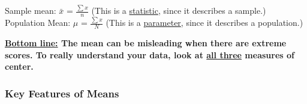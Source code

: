 \documentclass[11pt]{report}
\begin{document}
\noindent Sample mean: $\bar{x}$ = $\frac{\sum x}{n}$ (This is a \underline{statistic}, since it describes a sample.) 
\newline
Population Mean: $\mu$ = $\frac{\sum x}{N}$ (This is a \underline{parameter}, since it describes a population.)

{
    
    \textbf{\underline{Bottom line:} The mean can be misleading when there are extreme scores. To really understand your data, look at \underline{all three} measures of center.}
}

\subsubsection{Key Features of Means}
\end{document}
